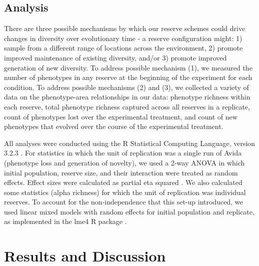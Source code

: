 \documentclass[letterpaper]{article}
\begin{document}
\subsection{Analysis}
    
	There are three possible mechanisms by which our reserve schemes could drive changes in diversity over evolutionary time - a reserve configuration might: 1) sample from a different range of locations across the environment, 2) promote improved maintenance of existing diversity, and/or 3)  promote improved generation of new diversity. To address possible mechanism (1), we measured the number of phenotypes in any reserve at the beginning of the experiment for each condition. To address possible mechanisms (2) and (3), we collected a variety of data on the phenotype-area relationships in our data: phenotype richness within each reserve, total phenotype richness captured across all reserves in a replicate, count of phenotypes lost over the experimental treatment, and count of new phenotypes that evolved over the course of the experimental treatment.
    
	All analyses were conducted using the R Statistical Computing Language, version 3.2.3 \citep{team_r:_2013}. For statistics in which the unit of replication was a single run of Avida (phenotype loss and generation of novelty), we used a 2-way ANOVA in which initial population, reserve size, and their interaction were treated as random effects. Effect sizes were calculated as partial eta squared \citep{lakens_calculating_2013}. We also calculated some statistics (alpha richness) for which the unit of replication was individual reserves. To account for the non-independence that this set-up introduced, we used linear mixed models with random effects for initial population and replicate, as implemented in the lme4 R package \citep{bates_fitting_2015}.

\section{Results and Discussion}
\end{document}
